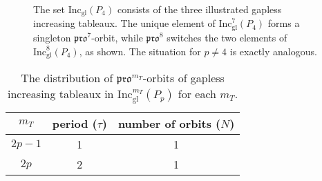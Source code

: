 \documentclass[12pt]{amsart}
\theoremstyle{definition}
\theoremstyle{remark}
\numberwithin{equation}{section}
\newcommand{\inc}{\ensuremath{\mathrm{Inc}}}
\newcommand{\incgl}{\inc_{\mathrm{gl}}}
\newcommand{\pro}{\mathfrak{pro}}
\begin{document}
\begin{figure}[h]
\caption{The set $\incgl(P_4)$ consists of the three illustrated gapless increasing tableaux. The unique element of $\incgl^7(P_4)$ forms a singleton $\pro^7$-orbit, while $\pro^8$ switches the two elements of $\incgl^8(P_4)$, as shown. The situation for $p \neq 4$ is exactly analogous.}\label{fig:propeller_orbits}
\end{figure}

\begin{table}[h]
\begin{tabular}{|c|c|c|}
\hline
$m_T$ & period ($\tau$) & number of orbits ($N$)\\
  \hline
  $2p-1$ & 1 & 1\\
  \hline
  $2p$ & 2 & 1\\ 
  \hline
\end{tabular}
\caption{The distribution of $\pro^{m_T}$-orbits of gapless increasing tableaux in $\incgl^{m_T}(P_p)$ for each ${m_T}$.}
\label{tab:prop}
\end{table}
\end{document}
